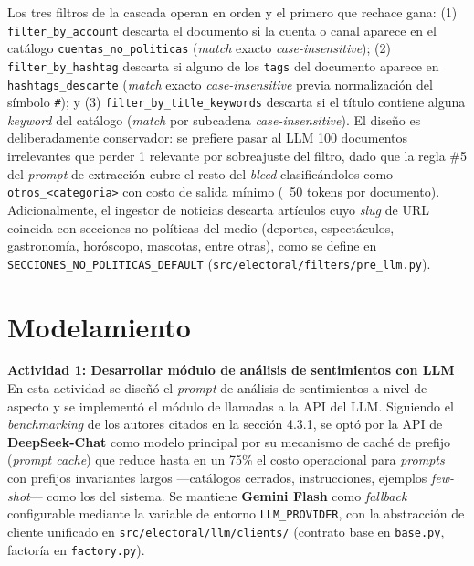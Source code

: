 \documentclass[listof=nochaptergap,12pt,times,authoryear]{report}
\begin{document}
Los tres filtros de la cascada operan en orden y el primero que rechace gana:
(1) \texttt{filter\_by\_account} descarta el documento si la cuenta o canal aparece
en el catálogo \texttt{cuentas\_no\_politicas} (\textit{match} exacto
\textit{case-insensitive}); (2) \texttt{filter\_by\_hashtag} descarta si alguno de
los \texttt{tags} del documento aparece en \texttt{hashtags\_descarte} (\textit{match}
exacto \textit{case-insensitive} previa normalización del símbolo \texttt{\#}); y
(3) \texttt{filter\_by\_title\_keywords} descarta si el título contiene alguna
\textit{keyword} del catálogo (\textit{match} por subcadena
\textit{case-insensitive}). El diseño es deliberadamente conservador: se prefiere
pasar al LLM 100 documentos irrelevantes que perder 1 relevante por sobreajuste
del filtro, dado que la regla \#5 del \textit{prompt} de extracción cubre el resto
del \textit{bleed} clasificándolos como \texttt{otros\_<categoria>} con costo de
salida mínimo (~50 tokens por documento). Adicionalmente, el ingestor de noticias
descarta artículos cuyo \textit{slug} de URL coincida con secciones no políticas
del medio (deportes, espectáculos, gastronomía, horóscopo, mascotas, entre otras),
como se define en \texttt{SECCIONES\_NO\_POLITICAS\_DEFAULT}
(\texttt{src/electoral/filters/pre\_llm.py}).

\section{Modelamiento}

\textbf{Actividad 1: Desarrollar módulo de análisis de sentimientos con LLM}
\\
En esta actividad se diseñó el \textit{prompt} de análisis de sentimientos a nivel
de aspecto y se implementó el módulo de llamadas a la API del LLM. Siguiendo el
\textit{benchmarking} de los autores citados en la sección 4.3.1, se optó por la
API de \textbf{DeepSeek-Chat} como modelo principal por su mecanismo de caché de
prefijo (\textit{prompt cache}) que reduce hasta en un 75\% el costo operacional
para \textit{prompts} con prefijos invariantes largos —catálogos cerrados,
instrucciones, ejemplos \textit{few-shot}— como los del sistema. Se mantiene
\textbf{Gemini Flash} como \textit{fallback} configurable mediante la variable
de entorno \texttt{LLM\_PROVIDER}, con la abstracción de cliente unificado en
\texttt{src/electoral/llm/clients/} (contrato base en \texttt{base.py}, factoría
en \texttt{factory.py}).
\end{document}

